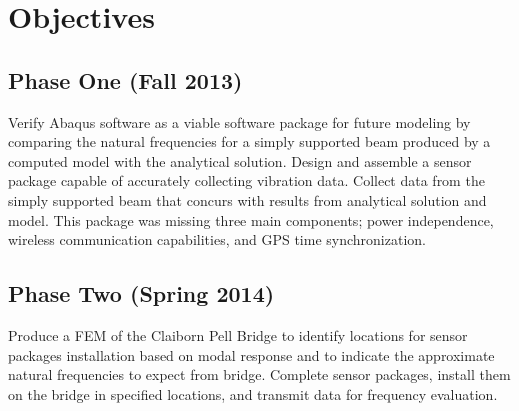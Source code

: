 \section{Objectives}
\subsection{Phase One (Fall 2013)}
\indent Verify Abaqus software as a viable software package for future modeling by comparing the natural frequencies for a simply supported beam produced by a computed model with the analytical solution. Design and assemble a sensor package capable of accurately collecting vibration data. Collect data from the simply supported beam that concurs with results from analytical solution and model. This package was missing three main components; power independence, wireless communication capabilities, and GPS time synchronization.\\
\subsection{Phase Two (Spring 2014)}
\indent Produce a FEM of the Claiborn Pell Bridge to identify locations for sensor packages installation based on modal response and to indicate the approximate natural frequencies to expect from bridge. Complete sensor packages, install them on the bridge in specified locations, and transmit data for frequency evaluation.\\
